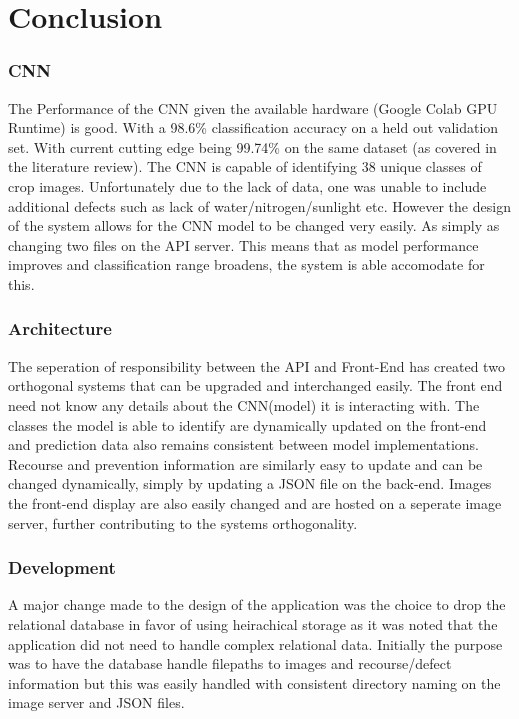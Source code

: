 \chapter{Conclusion}
\label{conclusion}
  \subsection{CNN}
    The Performance of the CNN given the available hardware (Google Colab GPU Runtime) is good. With a 98.6\% classification accuracy on a held out validation set. With current cutting edge being 99.74\% on the same dataset (as covered in the literature review). The CNN is capable of identifying 38 unique classes of crop images. Unfortunately due to the lack of data, one was unable to include additional defects such as lack of water/nitrogen/sunlight etc. However the design of the system allows for the CNN model to be changed very easily. As simply as changing two files on the API server. This means that as model performance improves and classification range broadens, the system is able accomodate for this.

  \subsection{Architecture}
    The seperation of responsibility between the API and Front-End has created two orthogonal systems that can be upgraded and interchanged easily. The front end need not know any details about the CNN(model) it is interacting with. The classes the model is able to identify are dynamically updated on the front-end and prediction data also remains consistent between model implementations. Recourse and prevention information are similarly easy to update and can be changed dynamically, simply by updating a JSON file on the back-end. Images the front-end display are also easily changed and are hosted on a seperate image server, further contributing to the systems orthogonality.

  \subsection{Development}
    A major change made to the design of the application was the choice to drop the relational database in favor of using heirachical storage as it was noted that the application did not need to handle complex relational data. Initially the purpose was to have the database handle filepaths to images and recourse/defect information but this was easily handled with consistent directory naming on the image server and JSON files.
    \par

